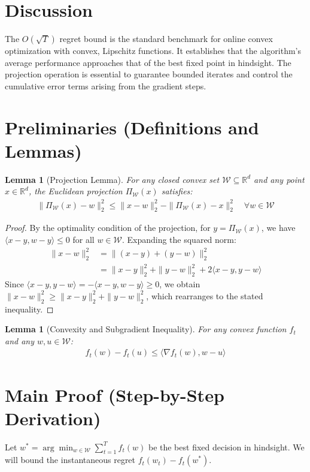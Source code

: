 \documentclass{article}
\newtheorem{lemma}[theorem]{Lemma}
\begin{document}
\section*{Discussion}
The $O(\sqrt{T})$ regret bound is the standard benchmark for online convex optimization with convex, Lipschitz functions. It establishes that the algorithm's average performance approaches that of the best fixed point in hindsight. The projection operation is essential to guarantee bounded iterates and control the cumulative error terms arising from the gradient steps.

\section*{Preliminaries (Definitions and Lemmas)}
\begin{lemma}[Projection Lemma]
For any closed convex set $\mathcal{W} \subseteq \mathbb{R}^d$ and any point $x \in \mathbb{R}^d$, the Euclidean projection $\Pi_{\mathcal{W}}(x)$ satisfies:
\begin{align*}
\|\Pi_{\mathcal{W}}(x) - w\|_2^2 \leq \|x - w\|_2^2 - \|\Pi_{\mathcal{W}}(x) - x\|_2^2 \quad \forall w \in \mathcal{W}
\end{align*}
\end{lemma}
\begin{proof}
By the optimality condition of the projection, for $y = \Pi_{\mathcal{W}}(x)$, we have $\langle x - y, w - y \rangle \leq 0$ for all $w \in \mathcal{W}$. Expanding the squared norm:
\begin{align*}
\|x - w\|_2^2 &= \|(x - y) + (y - w)\|_2^2 \\
&= \|x - y\|_2^2 + \|y - w\|_2^2 + 2 \langle x - y, y - w \rangle
\end{align*}
Since $\langle x - y, y - w \rangle = -\langle x - y, w - y \rangle \geq 0$, we obtain $\|x - w\|_2^2 \geq \|x - y\|_2^2 + \|y - w\|_2^2$, which rearranges to the stated inequality.
\end{proof}

\begin{lemma}[Convexity and Subgradient Inequality]
For any convex function $f_t$ and any $w, u \in \mathcal{W}$:
\begin{align*}
f_t(w) - f_t(u) \leq \langle \nabla f_t(w), w - u \rangle
\end{align*}
\end{lemma}

\section*{Main Proof (Step-by-Step Derivation)}
Let $w^* = \arg\min_{w \in \mathcal{W}} \sum_{t=1}^T f_t(w)$ be the best fixed decision in hindsight. We will bound the instantaneous regret $f_t(w_t) - f_t(w^*)$.
\end{document}
